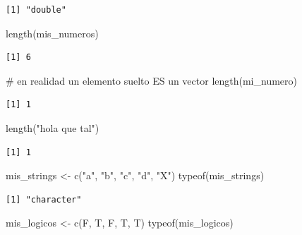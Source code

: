 \documentclass[
  letterpaper,
  DIV=11,
  numbers=noendperiod]{scrartcl}
\newenvironment{Shaded}{\begin{snugshade}}{\end{snugshade}}
\newcommand{\CommentTok}[1]{\textcolor[rgb]{0.37,0.37,0.37}{#1}}
\newcommand{\FunctionTok}[1]{\textcolor[rgb]{0.28,0.35,0.67}{#1}}
\newcommand{\NormalTok}[1]{\textcolor[rgb]{0.00,0.23,0.31}{#1}}
\newcommand{\OtherTok}[1]{\textcolor[rgb]{0.00,0.23,0.31}{#1}}
\newcommand{\StringTok}[1]{\textcolor[rgb]{0.13,0.47,0.30}{#1}}
\begin{document}
\begin{verbatim}
[1] "double"
\end{verbatim}

\begin{Shaded}
\begin{Highlighting}[]
\FunctionTok{length}\NormalTok{(mis\_numeros)}
\end{Highlighting}
\end{Shaded}

\begin{verbatim}
[1] 6
\end{verbatim}

\begin{Shaded}
\begin{Highlighting}[]
\CommentTok{\# en realidad un elemento suelto ES un vector }
\FunctionTok{length}\NormalTok{(mi\_numero)  }
\end{Highlighting}
\end{Shaded}

\begin{verbatim}
[1] 1
\end{verbatim}

\begin{Shaded}
\begin{Highlighting}[]
\FunctionTok{length}\NormalTok{(}\StringTok{"hola que tal"}\NormalTok{)}
\end{Highlighting}
\end{Shaded}

\begin{verbatim}
[1] 1
\end{verbatim}

\begin{Shaded}
\begin{Highlighting}[]
\NormalTok{mis\_strings }\OtherTok{\textless{}{-}} \FunctionTok{c}\NormalTok{(}\StringTok{"a"}\NormalTok{, }\StringTok{"b"}\NormalTok{, }\StringTok{"c"}\NormalTok{, }\StringTok{"d"}\NormalTok{, }\StringTok{"X"}\NormalTok{) }
\FunctionTok{typeof}\NormalTok{(mis\_strings) }
\end{Highlighting}
\end{Shaded}

\begin{verbatim}
[1] "character"
\end{verbatim}

\begin{Shaded}
\begin{Highlighting}[]
\NormalTok{mis\_logicos }\OtherTok{\textless{}{-}} \FunctionTok{c}\NormalTok{(F, T, F, T, T) }
\FunctionTok{typeof}\NormalTok{(mis\_logicos) }
\end{Highlighting}
\end{Shaded}
\end{document}
